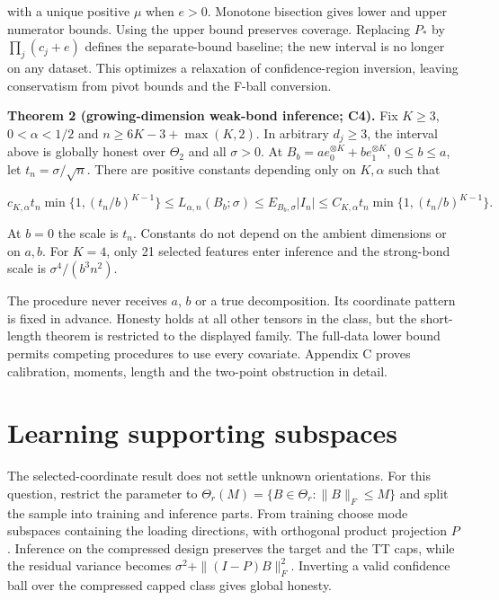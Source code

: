 \documentclass[
  11pt,
]{article}
\begin{document}
with a unique positive \(\mu\) when \(e>0\). Monotone bisection gives
lower and upper numerator bounds. Using the upper bound preserves
coverage. Replacing \(P_*\) by \(\prod_j(c_j+e)\) defines the
separate-bound baseline; the new interval is no longer on any dataset.
This optimizes a relaxation of confidence-region inversion, leaving
conservatism from pivot bounds and the F-ball conversion.

\textbf{Theorem 2 (growing-dimension weak-bond inference; C4).} Fix
\(K\ge3\), \(0<\alpha<1/2\) and \(n\ge6K-3+\max(K,2)\). In arbitrary
\(d_j\ge3\), the interval above is globally honest over \(\Theta_2\) and
all \(\sigma>0\). At \(B_b=a e_0^{\otimes K}+b e_1^{\otimes K}\),
\(0\le b\le a\), let \(t_n=\sigma/\sqrt n\). There are positive
constants depending only on \(K,\alpha\) such that

\[
c_{K,\alpha}t_n\min\{1,(t_n/b)^{K-1}\}
\le L_{\alpha,n}(B_b;\sigma)
\le E_{B_b,\sigma}|I_n|
\le C_{K,\alpha}t_n\min\{1,(t_n/b)^{K-1}\}.
\]

At \(b=0\) the scale is \(t_n\). Constants do not depend on the ambient
dimensions or on \(a,b\). For \(K=4\), only 21 selected features enter
inference and the strong-bond scale is \(\sigma^4/(b^3n^2)\).

The procedure never receives \(a\), \(b\) or a true decomposition. Its
coordinate pattern is fixed in advance. Honesty holds at all other
tensors in the class, but the short-length theorem is restricted to the
displayed family. The full-data lower bound permits competing procedures
to use every covariate. Appendix C proves calibration, moments, length
and the two-point obstruction in detail.

\section{Learning supporting
subspaces}\label{learning-supporting-subspaces}

The selected-coordinate result does not settle unknown orientations. For
this question, restrict the parameter to
\(\Theta_r(M)=\{B\in\Theta_r:\|B\|_F\le M\}\) and split the sample into
training and inference parts. From training choose mode subspaces
containing the loading directions, with orthogonal product projection
\(P\). Inference on the compressed design preserves the target and the
TT caps, while the residual variance becomes
\(\sigma^2+\|(I-P)B\|_F^2\). Inverting a valid confidence ball over the
compressed capped class gives global honesty.
\end{document}
